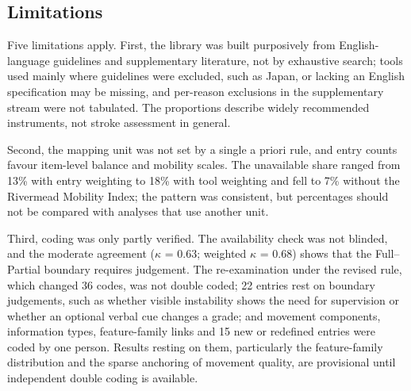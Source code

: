 \documentclass[11pt]{article}
\begin{document}
\subsection{Limitations}
\label{sec:limitations}

Five limitations apply. First, the library was built purposively from English-language guidelines and supplementary literature, not by exhaustive search; tools used mainly where guidelines were excluded, such as Japan, or lacking an English specification may be missing, and per-reason exclusions in the supplementary stream were not tabulated. The proportions describe widely recommended instruments, not stroke assessment in general.

Second, the mapping unit was not set by a single a priori rule, and entry counts favour item-level balance and mobility scales. The unavailable share ranged from 13\% with entry weighting to 18\% with tool weighting and fell to 7\% without the Rivermead Mobility Index; the pattern was consistent, but percentages should not be compared with analyses that use another unit.

Third, coding was only partly verified. The availability check was not blinded, and the moderate agreement ($\kappa$ = 0.63; weighted $\kappa$ = 0.68) shows that the Full--Partial boundary requires judgement. The re-examination under the revised rule, which changed 36 codes, was not double coded; 22 entries rest on boundary judgements, such as whether visible instability shows the need for supervision or whether an optional verbal cue changes a grade; and movement components, information types, feature-family links and 15 new or redefined entries were coded by one person. Results resting on them, particularly the feature-family distribution and the sparse anchoring of movement quality, are provisional until independent double coding is available.
\end{document}
